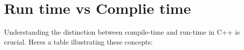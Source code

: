 \chapter{Run time vs Complie time}
\hypertarget{md_docs_2own__docs_2cpp__fudamentals_2runtime__vs__complietime}{}\label{md_docs_2own__docs_2cpp__fudamentals_2runtime__vs__complietime}
\label{md_docs_2own__docs_2cpp__fudamentals_2runtime__vs__complietime_autotoc_md167}%
%

\begin{DoxyItemize}
\item Understanding the distinction between compile-\/time and run-\/time in C++ is crucial. Here\textquotesingle{}s a table illustrating these concepts\+:
\end{DoxyItemize}

